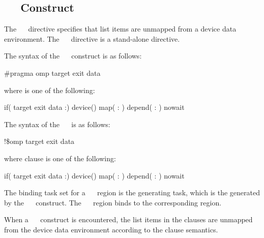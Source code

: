 \subsection{~~ Construct}
\label{subsec:target exit data Construct}
\summary
The ~~ directive specifies that list items are unmapped from a device data environment. The ~~ directive is a stand-alone directive.
\syntax
\begin{ccppspecific}
The syntax of the ~~ construct is as follows:
\begin{boxedcode}
\#pragma omp target exit data 
\end{boxedcode}
where  is one of the following:
\begin{indentedcodelist}
if(\plc{[} target exit data :\plc{] scalar-expression})
device()
map(\plc{[ [map-type-modifier[,]] map-type} : \plc{] list})
depend( : )
nowait
\end{indentedcodelist}
\end{ccppspecific}
\begin{fortranspecific}
The syntax of the ~~ is as follows:
\begin{boxedcode}
!\$omp target exit data 
\end{boxedcode}
where clause is one of the following:
\begin{indentedcodelist}
if(\plc{[} target exit data :\plc{] scalar-logical-expression})
device()
map(\plc{[ [map-type-modifier[,]] map-type} : \plc{] list})
depend( : )
nowait
\end{indentedcodelist}
\end{fortranspecific}

\binding
The binding task set for a ~~ region is
the generating task, which is the  generated by the
~~ construct. The
~~ region binds to the corresponding
 region.

\descr
When a ~~ construct is encountered, the list items in the  clauses are unmapped from the device data environment according to the  clause semantics.

